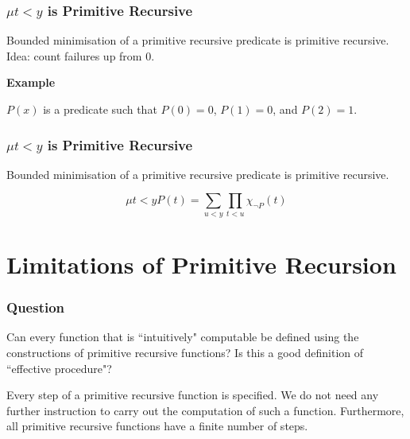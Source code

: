 \documentclass{beamer}
\theoremstyle{indentDefn} \newtheorem{defn}[]{Definition}
\begin{document}
\begin{frame}
	\frametitle{$\mu t < y$ is Primitive Recursive}

	Bounded minimisation of a primitive recursive predicate is primitive recursive. Idea: count failures up from 0.

	\vspace{0.5cm}

	{\bf Example}

	$P(x)$ is a predicate such that $P(0) = 0$, $P(1) = 0$, and $P(2) = 1$. 

	\vspace{7cm}

\end{frame}

\begin{frame}
	\frametitle{$\mu t < y$ is Primitive Recursive}

	Bounded minimisation of a primitive recursive predicate is primitive recursive. 

	$$\mu t < y P(t) = \sum_{u < y}\prod_{t < u}\chi_{\lnot P}(t) $$

	\vspace{7cm}
	

\end{frame}

\section{Limitations of Primitive Recursion}

\begin{frame}
  \frametitle{Question}

	Can every function that is ``intuitively" computable be defined using the constructions of primitive recursive functions? Is this a good definition of ``effective procedure"? 

	\vspace{0.5cm}

	Every step of a primitive recursive function is specified. We do not need any further instruction to carry out the computation of such a function. Furthermore, all primitive recursive functions have a finite number of steps. 

	\vspace{0.5cm}


\end{frame}
\end{document}
